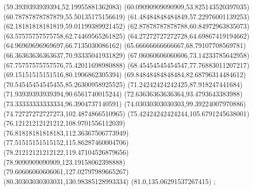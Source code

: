 {(59.3939393939394,52.19955881362083)
(60.09090909090909,53.825143520397035)
(60.78787878787879,55.50135175156619)
(61.48484848484849,57.22976001139253)
(62.18181818181819,59.01199389921452)
(62.87878787878788,60.84972963835073)
(63.57575757575758,62.74469565261825)
(64.27272727272728,64.69867419194662)
(64.96969696969697,66.7135030086162)
(65.66666666666667,68.79107708569781)
(66.36363636363637,70.93335041931829)
(67.06060606060606,73.14233785642958)
(67.75757575757576,75.42011698980888)
(68.45454545454547,77.76883011207217)
(69.15151515151516,80.1906862305394)
(69.84848484848484,82.68796314484612)
(70.54545454545455,85.26300958925525)
(71.24242424242425,87.918247441684)
(71.93939393939394,90.6561740015244)
(72.63636363636364,93.4793643383988)
(73.33333333333334,96.3904737140591)
(74.03030303030303,99.39224007970886)
(74.72727272727273,102.4874866510965)
(75.42424242424244,105.6791245638001)
(76.12121212121212,108.9701556112039)
(76.81818181818183,112.36367506773949)
(77.51515151515152,115.86287460004706)
(78.21212121212122,119.47104526879656)
(78.9090909090909,123.19158062398888)
(79.60606060606061,127.02797989665267)
(80.30303030303031,130.98385128993334)
(81.0,135.06291537267415)
};
